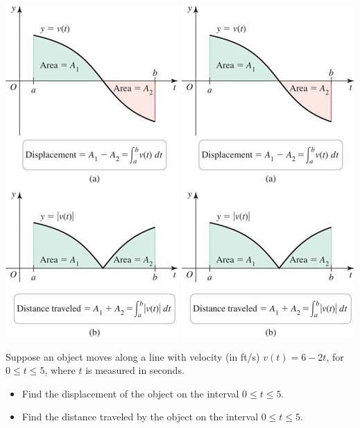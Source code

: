 \documentclass[../mathNotesPreamble]{subfiles}
\begin{document}
  \begin{center}
    \includegraphics[width=0.325\linewidth, trim={0mm, 78.5mm, 0mm, 0mm}, clip]{../images/briggs_06_01/fig06_02}
    \hspace*{0.05\linewidth}
    \includegraphics[width=0.325\linewidth, trim={0mm, 0mm, 0mm, 95mm}, clip]{../images/briggs_06_01/fig06_02}
  \end{center}
  \pagebreak
  \begin{ex*}
    Suppose an object moves along a line with velocity (in ft/s) $v(t)=6-2t$, for $0\leq t\leq 5$, where $t$ is measured in seconds. 
  \end{ex*}
  \begin{itemize}[itemsep=]
    \item 
      Find the displacement of the object on the interval $0\leq t\leq5$.
    \item 
      Find the distance traveled by the object on the interval $0\leq t\leq5$.
  \end{itemize}
\end{document}
